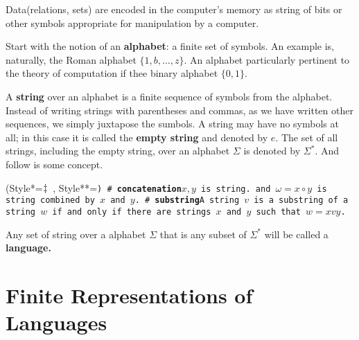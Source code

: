 Data(relations, sets) are encoded in the computer's memory as string of bits
or other symbols appropriate for manipulation by a computer.

Start with the notion of an {\bf alphabet}: a finite set of symbols.
An example is, naturally, the Roman alphabet $\{1, b,\ldots, z\}$. An
alphabet particularly pertinent to the theory of computation if thee binary alphabet 
$\{0,1\}$.

A {\bf string} over an alphabet is a finite sequence of symbols from the
alphabet. Instead of writing strings with parentheses and commas, as we have
written other sequences, we simply juxtapose the sumbols.
A string may have no symbols at all; in this case it is called the 
{\bf empty string} and denoted by $e$.
The set of all strings, including the empty string, over an alphabet $\Sigma$ is 
denoted by $\Sigma^\ast$. And follow is some concept.

\begin{easylist}[checklist]
\ListProperties(Style*=$\ddagger\hskip.5em$, Style**=\tt)
# {\bf concatenation}\quad $x, y$ is string. and $\omega = x\circ y$ is string combined by $x$ and $y$.
# {\bf substring}\quad A string $v$ is a substring of a string $w$ if and only if there are strings
$x$ and $y$ such that $w = xvy$.
\end{easylist}

Any set of string over a alphabet $\Sigma$ that is any subset of $\Sigma^\ast$ will be called
a {\bf language.}


\section{Finite Representations of Languages}